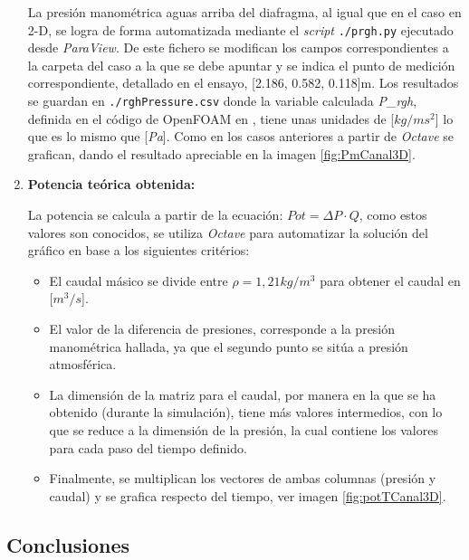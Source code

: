 \begin{enumerate}
  La presión manométrica aguas arriba del diafragma, al igual que en el
  caso en 2-D, se logra de forma automatizada mediante el \emph{script}
  \lstinline[style=bash]{./prgh.py} ejecutado desde \emph{ParaView}. De
  este fichero se modifican los campos correspondientes a la carpeta del
  caso a la que se debe apuntar y se indica el punto de medición
  correspondiente, detallado en el ensayo, {[}2.186, 0.582, 0.118{]}m.
  Los resultados se guardan en
  \lstinline[style=bash]{./rghPressure.csv} donde la variable calculada
  \emph{P\_rgh}, definida en el código de OpenFOAM en , tiene unas
  unidades de {[}\(kg/ms^2\){]} lo que es lo mismo que {[}\emph{Pa}{]}.
  Como en los casos anteriores a partir de \emph{Octave} se grafican, dando el resultado apreciable en la imagen \autoref{fig:PmCanal3D}.


\item
  \textbf{Potencia teórica obtenida:}

  La potencia se calcula a partir de la ecuación: \(Pot=\Delta P\cdot Q\),
  como estos valores son conocidos, se utiliza \emph{Octave} para
  automatizar la solución del gráfico en base a los siguientes
  critérios:

  \begin{itemize}
  \item
    El caudal másico se divide entre \(\rho=1,21kg/m^3\) para obtener el
    caudal en {[}\(m^3/s\){]}.
  \item
    El valor de la diferencia de presiones, corresponde a la presión
    manométrica hallada, ya que el segundo punto se sitúa a presión
    atmosférica.
  \item
    La dimensión de la matriz para el caudal, por manera en la que se ha
    obtenido (durante la simulación), tiene más valores intermedios, con
    lo que se reduce a la dimensión de la presión, la cual contiene los
    valores para cada paso del tiempo definido.
  \item
    Finalmente, se multiplican los vectores de ambas columnas (presión y
    caudal) y se grafica respecto del tiempo, ver imagen \autoref{fig:potTCanal3D}.
  \end{itemize}

\end{enumerate}

\subsection{Conclusiones}\label{header-n249}

